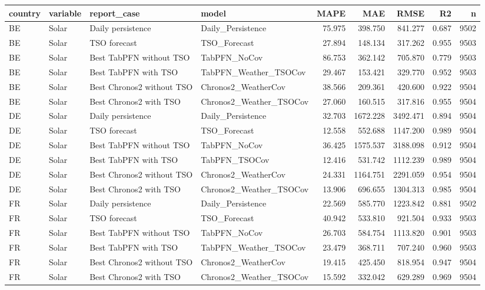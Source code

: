 \begin{tabular}{llllrrrrr}
\toprule
country & variable & report\_case & model & MAPE & MAE & RMSE & R2 & n \\
\midrule
BE & Solar & Daily persistence & Daily\_Persistence & 75.975 & 398.750 & 841.277 & 0.687 & 9502 \\
BE & Solar & TSO forecast & TSO\_Forecast & 27.894 & 148.134 & 317.262 & 0.955 & 9503 \\
BE & Solar & Best TabPFN without TSO & TabPFN\_NoCov & 86.753 & 362.142 & 705.870 & 0.779 & 9503 \\
BE & Solar & Best TabPFN with TSO & TabPFN\_Weather\_TSOCov & 29.467 & 153.421 & 329.770 & 0.952 & 9503 \\
BE & Solar & Best Chronos2 without TSO & Chronos2\_WeatherCov & 38.566 & 209.361 & 420.600 & 0.922 & 9504 \\
BE & Solar & Best Chronos2 with TSO & Chronos2\_Weather\_TSOCov & 27.060 & 160.515 & 317.816 & 0.955 & 9504 \\
DE & Solar & Daily persistence & Daily\_Persistence & 32.703 & 1672.228 & 3492.471 & 0.894 & 9504 \\
DE & Solar & TSO forecast & TSO\_Forecast & 12.558 & 552.688 & 1147.200 & 0.989 & 9504 \\
DE & Solar & Best TabPFN without TSO & TabPFN\_NoCov & 36.425 & 1575.537 & 3188.098 & 0.912 & 9504 \\
DE & Solar & Best TabPFN with TSO & TabPFN\_TSOCov & 12.416 & 531.742 & 1112.239 & 0.989 & 9504 \\
DE & Solar & Best Chronos2 without TSO & Chronos2\_WeatherCov & 24.331 & 1164.751 & 2291.059 & 0.954 & 9504 \\
DE & Solar & Best Chronos2 with TSO & Chronos2\_Weather\_TSOCov & 13.906 & 696.655 & 1304.313 & 0.985 & 9504 \\
FR & Solar & Daily persistence & Daily\_Persistence & 22.569 & 585.770 & 1223.842 & 0.881 & 9502 \\
FR & Solar & TSO forecast & TSO\_Forecast & 40.942 & 533.810 & 921.504 & 0.933 & 9503 \\
FR & Solar & Best TabPFN without TSO & TabPFN\_NoCov & 26.703 & 584.754 & 1113.820 & 0.901 & 9503 \\
FR & Solar & Best TabPFN with TSO & TabPFN\_Weather\_TSOCov & 23.479 & 368.711 & 707.240 & 0.960 & 9503 \\
FR & Solar & Best Chronos2 without TSO & Chronos2\_WeatherCov & 19.415 & 425.450 & 818.954 & 0.947 & 9504 \\
FR & Solar & Best Chronos2 with TSO & Chronos2\_Weather\_TSOCov & 15.592 & 332.042 & 629.289 & 0.969 & 9504 \\
\bottomrule
\end{tabular}
